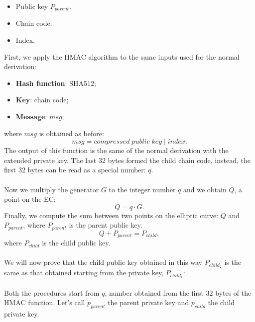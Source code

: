 \begin{itemize}
	\item Public key $P_{parent}$.
	\item Chain code.
	\item Index.
\end{itemize}
First, we apply the HMAC algorithm to the same inputs used for the normal derivation:
\begin{itemize}[label=$\odot$]
	\item \textbf{Hash function}: SHA512;
	\item \textbf{Key}: chain code;
	\item \textbf{Message}: $msg$;
\end{itemize}
where $msg$ is obtained as before:
\begin{equation*}
msg = compressed \; public\;key \;|\; index.
\end{equation*}
The output of this function is the same of the normal derivation with the extended private key. The last 32 bytes formed the child chain code, instead, the first 32 bytes can be read as a special number: $q$. 
\\ \\
Now we multiply the generator $G$ to the integer number $q$ and we obtain $Q$, a point on the EC:
\begin{equation*}
Q=q\cdot G.
\end{equation*}
Finally, we compute the sum between two points on the elliptic curve: $Q$ and $P_{parent}$, where $P_{parent}$ is the parent public key.
\begin{equation*}
Q+P_{parent}=P_{child},
\end{equation*}
where $P_{child}$ is the child public key. 
\\ \\
We will now prove that the child public key obtained in this way $P_{child_2}$ is the same as that obtained starting from the private key, $P_{child_1}$:
\\ \\
Both the procedures start from $q$, number obtained from the first 32 bytes of the HMAC function. Let's call $p_{parent}$ the parent private key and $p_{child}$ the child private key.

